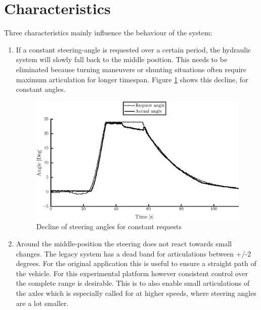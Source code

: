 \documentclass[root.tex]{subfiles}
\begin{document}
	
	{\pagestyle{empty}}
	\section{Characteristics}
	\label{chap:Delays}
	
	Three characteristics mainly influence the behaviour of the system: 
	
	\begin{enumerate}
		\item If a constant steering-angle is requested over a certain period, the hydraulic system will slowly fall back to the middle position. This needs to be eliminated because turning maneuvers or shunting situations often require maximum articulation for longer timespan. Figure \ref{fig:Constant_request} shows this decline, for constant angles.
		
		\begin{figure}[!h]
			
			\includegraphics[width=1\linewidth]{front}
			\caption[Decline of steering angles for constant requests]{Decline of steering angles for constant requests}
			
			\label{fig:Constant_request}
		\end{figure}
		
		\item Around the middle-position the steering does not react towards small changes. The legacy system has a dead band for articulations between +/-2 degrees. For the original application this is useful to ensure a straight path of the vehicle. For this experimental platform however consistent control over the complete range is desirable. This is to also enable small articulations of the axles which is especially called for at higher speeds, where steering angles are a lot smaller. 
		

\end{enumerate}
\end{document}
